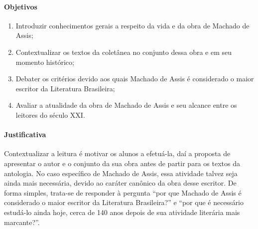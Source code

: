 \documentclass[12pt]{extarticle}
\begin{document}
\paragraph{Objetivos}
\begin{enumerate}
\item
Introduzir conhecimentos gerais a respeito da
vida e da obra de Machado de Assis; 

\item
Contextualizar os textos da
coletânea no conjunto dessa obra e em seu momento histórico; 

\item
Debater os critérios devido aos quais Machado de Assis é considerado o maior
escritor da Literatura Brasileira; 

\item
Avaliar a atualidade da obra de
Machado de Assis e seu alcance entre os leitores do século XXI.
\end{enumerate}

\paragraph{Justificativa} Contextualizar a leitura é motivar os alunos a
efetuá-la, daí a proposta de apresentar o autor e o conjunto da sua obra
antes de partir para os textos da antologia. No caso específico de
Machado de Assis, essa atividade talvez seja ainda mais necessária,
devido ao caráter canônico da obra desse escritor. De forma simples,
trata-se de responder à pergunta ``por que Machado de Assis é
considerado o maior escritor da Literatura Brasileira?'' e ``por que é
necessário estudá-lo ainda hoje, cerca de 140 anos depois de sua
atividade literária mais marcante?''.
\end{document}
